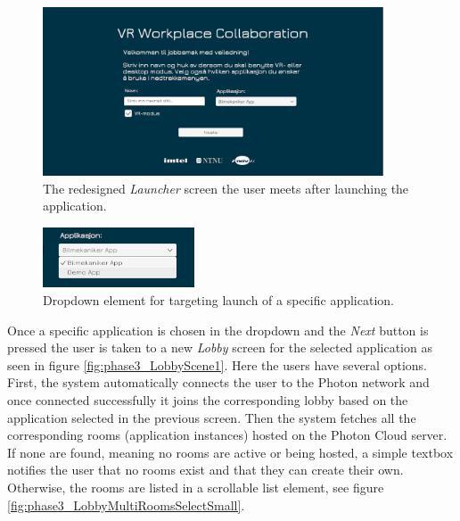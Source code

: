 \begin{figure}[H]
  \centering
   \captionsetup{width=.9\linewidth}
    \includegraphics[width=0.9\textwidth]{fig/phase_3/implementation/Lobby1.PNG}
 \caption{The redesigned \textit{Launcher} screen the user meets after launching the application.}
\label{fig:phase3_lobby1}
\end{figure}



\begin{figure}[H]
  \centering
   \captionsetup{width=.4\linewidth}
    \includegraphics[width=0.4\textwidth]{fig/phase_3/implementation/LauncherDropdown1.png}
 \caption{Dropdown element for targeting launch of a specific application. }
\label{fig:phase3_dropwdown}
\end{figure}

Once a specific application is chosen in the dropdown and the \textit{Next} button is pressed the user is taken to a new \textit{Lobby} screen for the selected application as seen in figure \ref{fig:phase3_LobbyScene1}. Here the users have several options. First, the system automatically connects the user to the Photon network and once connected successfully it joins the corresponding lobby based on the application selected in the previous screen.    
Then the system fetches all the corresponding rooms (application instances) hosted on the Photon Cloud server. If none are found, meaning no rooms are active or being hosted, a simple textbox notifies the user that no rooms exist and that they can create their own. Otherwise, the rooms are listed in a scrollable list element, see figure \ref{fig:phase3_LobbyMultiRoomsSelectSmall}. 

